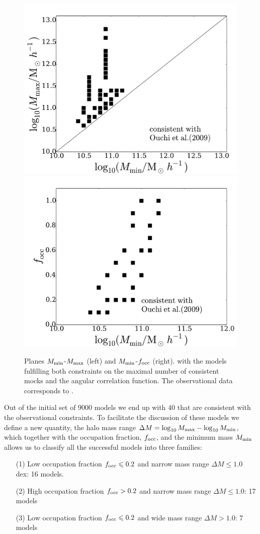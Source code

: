 \documentclass[usenatbib]{mn2e}
\begin{document}
\begin{figure}
\begin{center}
\includegraphics[width=0.46\linewidth,angle=0]{Fig6_mass.pdf}
\hspace{5mm}
\includegraphics[width=0.46\linewidth,angle=0]{Fig6_f_occ.pdf}
\end{center}
\caption{Planes $M_{\rm min}$-$M_{\rm max}$ (left) and $M_{\rm
    min}$-$f_{\rm occ}$ (right). with the models fulfilling both
   constraints on the maximal number of consistent mocks and the
  angular correlation function. The observational data corresponds to
  \citet{Ouchi2010}.   
  \label{fig:restriction_mock_and_f_occ_corr}} 
\end{figure} 



Out of the initial set of $9000$ models we end up with $40$ that are
consistent with the observational constraints. To facilitate the
discussion of these models we define a new quantity, the halo mass
range $\Delta M=\log_{10}M_{\rm max} - \log_{10}M_{\rm  min}$, which
together with the occupation fraction, $f_{\rm occ}$, and the minimum
mass $M_{\rm min}$ allows us to classify all the successful models into
three families:     
  

\begin{itemize}
\item[(1)] Low occupation fraction $f_{\rm occ}\leq 0.2$ and narrow
  mass range $\Delta M\leq 1.0$ 
  dex: 16 models. 
\item[(2)] High occupation fraction $f_{\rm occ}> 0.2$ and
  narrow mass range $\Delta M\leq 1.0$: 17 models 
\item[(3)] Low occupation fraction $f_{\rm occ}\leq 0.2$ 
  and wide mass range $\Delta M>1.0$: 7 models
\end{itemize}
\end{document}
